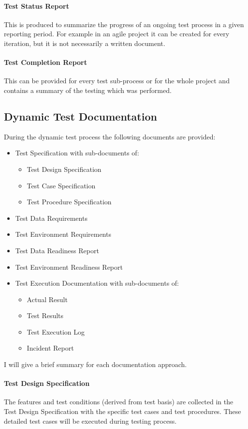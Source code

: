 \paragraph{Test Status Report}
This is produced to summarize the progress of an ongoing test process in a given reporting period. For example in an agile project it can be created for every iteration, but it is not necessarily a written document.

\paragraph{Test Completion Report}
This can be provided for every test sub-process or for the whole project and contains a summary of the testing which was performed.

\subsection{Dynamic Test Documentation}
During the dynamic test process the following documents are provided:
\begin{itemize}
	\item Test Specification with sub-documents of:
	\begin{itemize}
		\item Test Design Specification
		\item Test Case Specification
		\item Test Procedure Specification
	\end{itemize}
	\item Test Data Requirements
	\item Test Environment Requirements
	\item Test Data Readiness Report
	\item Test Environment Readiness Report
	\item Test Execution Documentation with sub-documents of:
	\begin{itemize}
		\item Actual Result
		\item Test Results
		\item Test Execution Log
		\item Incident Report
	\end{itemize}
\end{itemize}

I will give a brief summary for each documentation approach.

\paragraph{Test Design Specification} \label{TestDoc:TDS}
The features and test conditions (derived from test basis) are collected in the Test Design Specification with the specific test cases and test procedures. These detailed test cases will be executed during testing process. 

